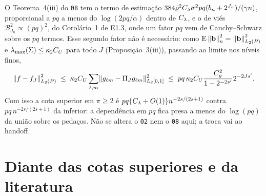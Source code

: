 \documentclass[11pt,a4paper]{article}
\newcommand{\lmaxx}{\lambda_{\max}}
\newcommand{\bb}{\mathbf{b}}
\newcommand{\bn}{b_{n}}
\begin{document}
\begin{remark}\label{rem:pq}
O Teorema~4(iii) do \texttt{08} tem o termo de estimação
$384\bar\varrho^{2}C_{\pen}\sigma^{2}pq(\bn + 2^{J_{n}})/(\gamma n)$, proporcional
a $pq$ a menos do $\log(2pq/\alpha)$ dentro de $C_{\lambda}$, e o de viés
$\mathcal{B}_{J_{n}}^{2} \propto (pq)^{2}$, do Corolário~1 de E1.3, onde um
fator $pq$ vem de Cauchy--Schwarz sobre os $pq$ termos. Esse segundo fator não
é necessário: como $\E\normn{\bb}^{2} = \normL{\bb}^{2}$ e
$\lmaxx(\Gram) \le \kappa_{2}C_{U}$ para todo $J$ (Proposição~3(iii)),
passando ao limite nos níveis finos,
\[
  \left\lVert f - f_{J} \right\rVert_{L_2(P)}^{2} \;\le\; \kappa_{2}C_{U}\sum_{\ell,m}
  \lVert g_{\ell m} - \Pi_{J}g_{\ell m}\rVert_{L_{2}[0,1]}^{2}
  \;\le\; pq\,\kappa_{2}C_{U}\frac{C_{g}^{2}}{1 - 2^{-2s'}}2^{-2Js'}.
\]
Com isso a cota superior em $\pi \ge 2$ é $pq\{C_{\lambda} + O(1)\}n^{-2s/(2s+1)}$
contra $pq\,n^{-2s/(2s+1)}$ da inferior: a dependência em $pq$ fica presa a
menos do $\log(pq)$ da união sobre os pedaços. Não se altera o \texttt{02}
nem o \texttt{08} aqui; a troca vai ao handoff.
\end{remark}

\section{Diante das cotas superiores e da literatura}
\end{document}
